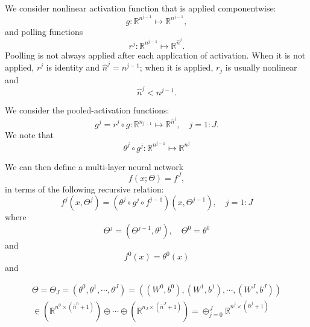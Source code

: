 We consider nonlinear activation function that is applied componentwise:
\begin{equation}\label{DNN_iteration_vector}
g:\mathbb R^{ n^{j-1}}\mapsto \mathbb R^{n^{j-1}},
\end{equation}
and polling functions
\begin{equation}\label{DNN_iteration_vector}
r^j:\mathbb R^{ n^{j-1}}\mapsto \mathbb R^{\hat n^{j}}. 
\end{equation}
Poolling is not always applied after each application of activation.
When it is not applied, $r^j$ is identity and $\hat n^j=n^{j-1}$;   when
it is applied, $r_j$ is usually nonlinear and
$$
\hat n^j<n^{j-1}. 
$$

We consider the pooled-activation functions:
\begin{equation}\label{DNN_iteration_vector}
g^j=r^j\circ g: \mathbb R^{{n}_{j-1}}\mapsto
\mathbb R^{\hat n^{j}}, \quad j =  1 :J.
\end{equation}
We note that
\begin{equation}
\theta^j\circ g^j:    \mathbb R^{{n}^{j-1}}\mapsto
\mathbb R^{n^{j}}
\end{equation}

We can then define a multi-layer neural network
	\begin{equation}\label{DNN_finallayer}
	f(x; \Theta) = f^J,
	\end{equation}
        in terms of the following recursive relation:
	\begin{equation}\label{DNN_iteration_vector}
	f^j(x,\Theta^j) = (\theta^j\circ g^j\circ
        f^{j-1})(x,\Theta^{j-1}), \quad j=1:J
	\end{equation}
where
\begin{equation}
\Theta^j=(\Theta^{j-1},\theta^j), \quad \Theta^0=\theta^0
\end{equation}
and
	\begin{equation}
	f^0(x)=\theta^0(x)
	\end{equation}
	and 

\begin{align}
\Theta =\Theta_J =(\theta^0,\theta^1, \cdots, \theta^J)=( ({W^0}, {b^0}),({W^1}, {b^1}),
\cdots, ({W^J}, {b^J})) \\
\displaystyle
	\in  (\mathbb{R}^{n^0 \times (\hat n^0 + 1)}) \oplus \cdots
        \oplus  	(\mathbb{R}^{{n}_{J} \times (\hat
          n^{J}+1)})=
\oplus_{j=0}^J \mathbb{R}^{n^{j} \times (\hat n^{j} + 1)}
\end{align}



